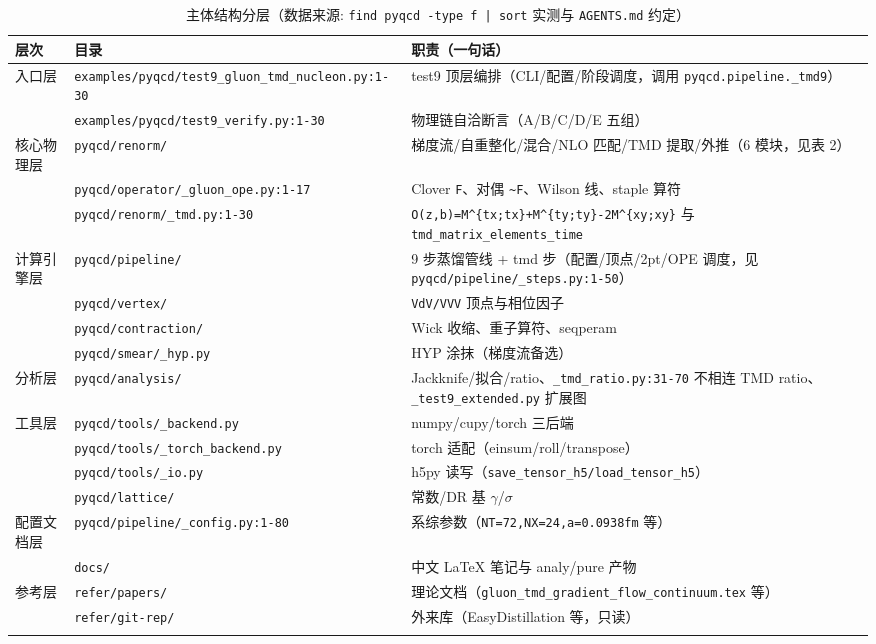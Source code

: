 \documentclass[UTF8]{ctexart}
\begin{document}
\tiny
\begin{xltabular}{\textwidth}{llX}
\toprule
\textcolor{struct}{层次} & 目录 & \textcolor{struct}{职责（一句话）} \\
\midrule
\endhead
入口层 & \texttt{\nolinkurl{examples/pyqcd/test9\_gluon\_tmd\_nucleon.py:1-30}} & test9 顶层编排（CLI/配置/阶段调度，调用 \texttt{\nolinkurl{pyqcd.pipeline.\_tmd9}}） \\
 & \texttt{\nolinkurl{examples/pyqcd/test9\_verify.py:1-30}} & 物理链自洽断言（A/B/C/D/E 五组） \\
核心物理层 & \texttt{\nolinkurl{pyqcd/renorm/}} & 梯度流/自重整化/混合/NLO 匹配/TMD 提取/外推（6 模块，见表 2） \\
 & \texttt{\nolinkurl{pyqcd/operator/\_gluon\_ope.py:1-17}} & Clover \texttt{\nolinkurl{F}}、对偶 \texttt{\nolinkurl{\~F}}、Wilson 线、staple 算符 \\
 & \texttt{\nolinkurl{pyqcd/renorm/\_tmd.py:1-30}} & \texttt{\nolinkurl{O(z,b)=M^{tx;tx}+M^{ty;ty}-2M^{xy;xy}}} 与 \texttt{\nolinkurl{tmd\_matrix\_elements\_time}} \\
计算引擎层 & \texttt{\nolinkurl{pyqcd/pipeline/}} & 9 步蒸馏管线 + tmd 步（配置/顶点/2pt/OPE 调度，见 \texttt{\nolinkurl{pyqcd/pipeline/\_steps.py:1-50}}） \\
 & \texttt{\nolinkurl{pyqcd/vertex/}} & \texttt{\nolinkurl{VdV/VVV}} 顶点与相位因子 \\
 & \texttt{\nolinkurl{pyqcd/contraction/}} & Wick 收缩、重子算符、seqperam \\
 & \texttt{\nolinkurl{pyqcd/smear/\_hyp.py}} & HYP 涂抹（梯度流备选） \\
分析层 & \texttt{\nolinkurl{pyqcd/analysis/}} & Jackknife/拟合/ratio、\texttt{\nolinkurl{\_tmd\_ratio.py:31-70}} 不相连 TMD ratio、\texttt{\nolinkurl{\_test9\_extended.py}} 扩展图 \\
工具层 & \texttt{\nolinkurl{pyqcd/tools/\_backend.py}} & numpy/cupy/torch 三后端 \\
 & \texttt{\nolinkurl{pyqcd/tools/\_torch\_backend.py}} & torch 适配（einsum/roll/transpose） \\
 & \texttt{\nolinkurl{pyqcd/tools/\_io.py}} & h5py 读写（\texttt{\nolinkurl{save\_tensor\_h5/load\_tensor\_h5}}） \\
 & \texttt{\nolinkurl{pyqcd/lattice/}} & 常数/DR 基 $\gamma$/$\sigma$ \\
配置文档层 & \texttt{\nolinkurl{pyqcd/pipeline/\_config.py:1-80}} & 系综参数（\texttt{\nolinkurl{NT=72,NX=24,a=0.0938fm}} 等） \\
 & \texttt{\nolinkurl{docs/}} & 中文 LaTeX 笔记与 analy/pure 产物 \\
参考层 & \texttt{\nolinkurl{refer/papers/}} & 理论文档（\texttt{\nolinkurl{gluon\_tmd\_gradient\_flow\_continuum.tex}} 等） \\
 & \texttt{\nolinkurl{refer/git-rep/}} & 外来库（EasyDistillation 等，只读） \\
\bottomrule
\caption{主体结构分层（数据来源: \texttt{\nolinkurl{find pyqcd -type f | sort}} 实测与 \texttt{\nolinkurl{AGENTS.md}} 约定）}
\end{xltabular}
\end{document}
